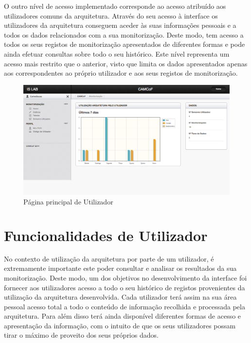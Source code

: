 O outro nível de acesso implementado corresponde ao acesso atribuído aos utilizadores comuns da arquitetura. Através do seu acesso à interface os utilizadores da arquitetura conseguem aceder às suas informações pessoais e a todos os dados relacionados com a sua monitorização. Deste modo, tem acesso a todos os seus registos de monitorização apresentados de diferentes formas e pode ainda efetuar consultas sobre todo o seu histórico. Este nível representa um acesso mais restrito que o anterior, visto que limita os dados apresentados apenas aos correspondentes ao próprio utilizador e aos seus registos de monitorização.

 \begin{figure}[htb]
   \centering
   \includegraphics[scale=0.29]{Images/home1.png}
   \caption{Página principal de Utilizador}
\end{figure}

\section{Funcionalidades de Utilizador}

No contexto de utilização da arquitetura por parte de um utilizador, é extremamente importante este poder consultar e analisar os resultados da sua monitorização. Deste modo, um dos objetivos no desenvolvimento da interface foi fornecer aos utilizadores acesso a todo o seu histórico de registos provenientes da utilização da arquitetura desenvolvida. Cada utilizador terá assim na sua área pessoal acesso total a todo o conteúdo de informação recolhida e processada pela arquitetura. Para além disso terá ainda disponível diferentes formas de acesso e apresentação da informação, com o intuito de que os seus utilizadores possam tirar o máximo de proveito dos seus próprios dados.

